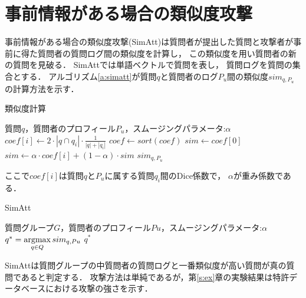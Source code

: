\documentclass[master]{suribt}
\theoremstyle{definition}
\newcommand{\argmax}{\mathop{\rm argmax}\limits}
\begin{document}
 \section{事前情報がある場合の類似度攻撃}\label{s:SimAtt}
 事前情報がある場合の類似度攻撃(SimAtt)\cite{simattack2016}は質問者が提出した質問と攻撃者が事前に得た質問者の質問ログ間の類似度を計算し，
 この類似度を用い質問者の新の質問を見破る．
 SimAttでは単語ベクトルで質問を表し，
 質問ログを質問の集合とする．
 アルゴリズム\ref{a:simatt}が質問$q$と質問者のログ$P_u$間の類似度$sim_{q,P_u}$の計算方法を示す．

 \begin{algorithm}
 \caption{類似度計算}
 \begin{algorithmic}[1]
  \Require 質問$q$，質問者のプロフィール$P_u$，スムージングパラメータ:$\alpha$
  \State $coef[i] \leftarrow 2 \cdot |q \cap q_i| \cdot \frac{1}{|q|+|q_i|}$
  \EndFor
  \State $coef \gets sort(coef)$
  \State $sim \gets coef[0]$
  \State $sim \gets \alpha \cdot coef[i] + (1 - \alpha) \cdot sim$
  \EndFor
  \Ensure $sim_{q,P_u}$
 \end{algorithmic}
 \label{a:simatt}
 \end{algorithm}

 ここで$coef[i]$は質問$q$と$P_u$に属する質問$q_i$間のDice係数\cite{dice1945}で，
 $\alpha$が重み係数である．
  
 \begin{algorithm}
 \caption{SimAtt}
 \begin{algorithmic}[1]
   \Require 質問グループ$G$，質問者のプロフィール$Pu$，スムージングパラメータ:$\alpha$
   \State $q^* = \argmax_{q \in Q}sim_{q,Pu}$
   \Ensure $q^*$
 \end{algorithmic}
 \end{algorithm}

 SimAttは質問グループの中質問者の質問ログと一番類似度が高い質問が真の質問であると判定する．
 攻撃方法は単純であるが，第\ref{s:ex}章の実験結果は特許データベースにおける攻撃の強さを示す．
\end{document}
